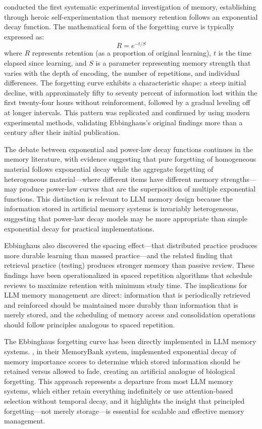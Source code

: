 \citet{ebbinghaus1885memory} conducted the first systematic experimental investigation of memory, establishing through heroic self-experimentation that memory retention follows an exponential decay function. The mathematical form of the forgetting curve is typically expressed as:
\begin{equation}
R = e^{-t/S}
\end{equation}
where $R$ represents retention (as a proportion of original learning), $t$ is the time elapsed since learning, and $S$ is a parameter representing memory strength that varies with the depth of encoding, the number of repetitions, and individual differences. The forgetting curve exhibits a characteristic shape: a steep initial decline, with approximately fifty to seventy percent of information lost within the first twenty-four hours without reinforcement, followed by a gradual leveling off at longer intervals. This pattern was replicated and confirmed by \citet{murre2015replication} using modern experimental methods, validating Ebbinghaus's original findings more than a century after their initial publication.

The debate between exponential and power-law decay functions continues in the memory literature, with evidence suggesting that pure forgetting of homogeneous material follows exponential decay while the aggregate forgetting of heterogeneous material---where different items have different memory strengths---may produce power-law curves that are the superposition of multiple exponential functions. This distinction is relevant to LLM memory design because the information stored in artificial memory systems is invariably heterogeneous, suggesting that power-law decay models may be more appropriate than simple exponential decay for practical implementations.

Ebbinghaus also discovered the spacing effect---that distributed practice produces more durable learning than massed practice---and the related finding that retrieval practice (testing) produces stronger memory than passive review. These findings have been operationalized in spaced repetition algorithms that schedule reviews to maximize retention with minimum study time. The implications for LLM memory management are direct: information that is periodically retrieved and reinforced should be maintained more durably than information that is merely stored, and the scheduling of memory access and consolidation operations should follow principles analogous to spaced repetition.

The Ebbinghaus forgetting curve has been directly implemented in LLM memory systems. \citet{zhong2024memorybank}, in their MemoryBank system, implemented exponential decay of memory importance scores to determine which stored information should be retained versus allowed to fade, creating an artificial analogue of biological forgetting. This approach represents a departure from most LLM memory systems, which either retain everything indefinitely or use attention-based selection without temporal decay, and it highlights the insight that principled forgetting---not merely storage---is essential for scalable and effective memory management.

